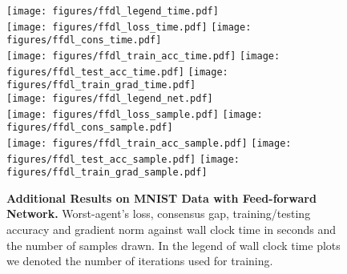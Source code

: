 \documentclass[10pt]{article} %
\theoremstyle{plain}
\theoremstyle{definition}
\theoremstyle{remark}
\begin{document}
\begin{samepage}
\begin{figure}[hbtp]
\centering
    \texttt{[image: figures/ffdl\_legend\_time.pdf]}\\
    \texttt{[image: figures/ffdl\_loss\_time.pdf]}
    \texttt{[image: figures/ffdl\_cons\_time.pdf]}\\
    \texttt{[image: figures/ffdl\_train\_acc\_time.pdf]}
    \texttt{[image: figures/ffdl\_test\_acc\_time.pdf]}
    \texttt{[image: figures/ffdl\_train\_grad\_time.pdf]}\\ \vspace{.4cm}
    \texttt{[image: figures/ffdl\_legend\_net.pdf]}\\
    \texttt{[image: figures/ffdl\_loss\_sample.pdf]}
    \texttt{[image: figures/ffdl\_cons\_sample.pdf]}\\
    \texttt{[image: figures/ffdl\_train\_acc\_sample.pdf]}
    \texttt{[image: figures/ffdl\_test\_acc\_sample.pdf]}
    \texttt{[image: figures/ffdl\_train\_grad\_sample.pdf]}\\
    \caption{\textbf{Additional Results on MNIST Data with Feed-forward Network.} Worst-agent's loss, consensus gap, training/testing accuracy and gradient norm against wall clock time in seconds and the number of samples drawn. In the legend of wall clock time plots we denoted the number of iterations used for training.} \label{fig:ffdl_app} \vspace{-.4cm}
\end{figure}
\end{samepage}

    
\end{document}
